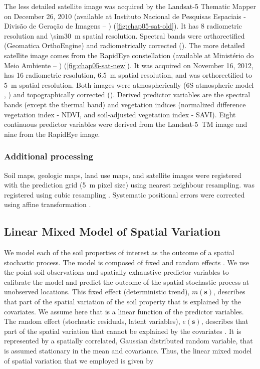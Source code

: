 The less detailed satellite image was acquired by the Landsat-\num{5} Thematic Mapper on December \num{26}, 
\num{2010} (available at Instituto Nacional de Pesquisas Espaciais - Divisão de Geração de Imagens -- 
\inpedgi) (\autoref{fig:chap05-sat-old}). It has \SI{8}{\bit} radiometric resolution and \SI{\sim30}{\m} 
spatial resolution. Spectral bands were orthorectified (Geomatica OrthoEngine) and radiometrically corrected 
(). The more detailed satellite image comes from the RapidEye constellation (available 
at Ministério do Meio Ambiente -- \mma) (\autoref{fig:chap05-sat-new}). It was acquired on November \num{16}, 
\num{2012}, has \SI{16}{\bit} radiometric resolution, \SI{6.5}{\m} spatial resolution, and was orthorectified 
to \SI{5}{\m} spatial resolution. Both images were atmospherically (6S atmospheric model 
\cite{VermoteEtAl1997}, ) and topographically corrected (). Derived 
predictor variables are the spectral bands (except the thermal band) and vegetation indices (normalized 
difference vegetation index - NDVI, and soil-adjusted vegetation index - SAVI). Eight continuous predictor 
variables were derived from the Landsat-5~TM image and nine from the RapidEye image.

\subsubsection{Additional processing}
\label{subsubsec:chap05-sources-processing}

Soil maps, geologic maps, land use maps, and satellite images were registered with the prediction grid 
(\SI{5}{\m} pixel size) using nearest neighbour resampling. \demOld{} was registered using cubic resampling 
\cite{Samuel-RosaEtAl2013c}. Systematic positional errors were corrected using affine transformation 
\cite{Samuel-RosaEtAl2014}.

\subsection{Linear Mixed Model of Spatial Variation}
\label{subsec:chap05-lmm}

We model each of the soil properties of interest as the outcome of a spatial stochastic process. The model is 
composed of fixed and random effects \cite{HeuvelinkEtAl2001, LarkEtAl2006}. We use the point soil 
observations and spatially exhaustive predictor variables to calibrate the model and predict the outcome of 
the 
spatial stochastic process at unobserved locations. This fixed effect (deterministic trend), $m(\textbf{s})$, 
describes that part of the spatial variation of the soil property that is explained by the covariates. We 
assume here that is a linear function of the predictor variables. The random effect (stochastic residuals, 
latent variables), $e(\textbf{s})$, describes that part of the spatial variation that cannot be 
explained by the covariates \cite{Cressie1993}. It is represented by a spatially correlated, Gaussian 
distributed random variable, that is assumed stationary in the mean and covariance. Thus, the linear mixed 
model of spatial variation that we employed is given by

